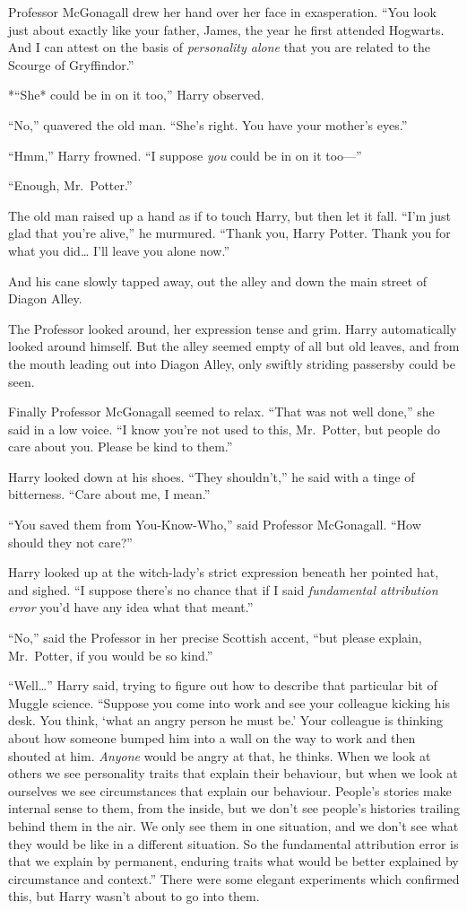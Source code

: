 Professor McGonagall drew her hand over her face in exasperation. ``You
look just about exactly like your father, James, the year he first
attended Hogwarts. And I can attest on the basis of \emph{personality
alone} that you are related to the Scourge of Gryffindor.''

*``She* could be in on it too,'' Harry observed.

``No,'' quavered the old man. ``She's right. You have your mother's
eyes.''

``Hmm,'' Harry frowned. ``I suppose \emph{you} could be in on it
too---''

``Enough, Mr.~Potter.''

The old man raised up a hand as if to touch Harry, but then let it fall.
``I'm just glad that you're alive,'' he murmured. ``Thank you, Harry
Potter. Thank you for what you did\ldots{} I'll leave you alone now.''

And his cane slowly tapped away, out the alley and down the main street
of Diagon Alley.

The Professor looked around, her expression tense and grim. Harry
automatically looked around himself. But the alley seemed empty of all
but old leaves, and from the mouth leading out into Diagon Alley, only
swiftly striding passersby could be seen.

Finally Professor McGonagall seemed to relax. ``That was not well
done,'' she said in a low voice. ``I know you're not used to this,
Mr.~Potter, but people do care about you. Please be kind to them.''

Harry looked down at his shoes. ``They shouldn't,'' he said with a tinge
of bitterness. ``Care about me, I mean.''

``You saved them from You-Know-Who,'' said Professor McGonagall. ``How
should they not care?''

Harry looked up at the witch-lady's strict expression beneath her
pointed hat, and sighed. ``I suppose there's no chance that if I said
\emph{fundamental attribution error} you'd have any idea what that
meant.''

``No,'' said the Professor in her precise Scottish accent, ``but please
explain, Mr.~Potter, if you would be so kind.''

``Well\ldots{}'' Harry said, trying to figure out how to describe that
particular bit of Muggle science. ``Suppose you come into work and see
your colleague kicking his desk. You think, `what an angry person he
must be.' Your colleague is thinking about how someone bumped him into a
wall on the way to work and then shouted at him. \emph{Anyone} would be
angry at that, he thinks. When we look at others we see personality
traits that explain their behaviour, but when we look at ourselves we
see circumstances that explain our behaviour. People's stories make
internal sense to them, from the inside, but we don't see people's
histories trailing behind them in the air. We only see them in one
situation, and we don't see what they would be like in a different
situation. So the fundamental attribution error is that we explain by
permanent, enduring traits what would be better explained by
circumstance and context.'' There were some elegant experiments which
confirmed this, but Harry wasn't about to go into them.

